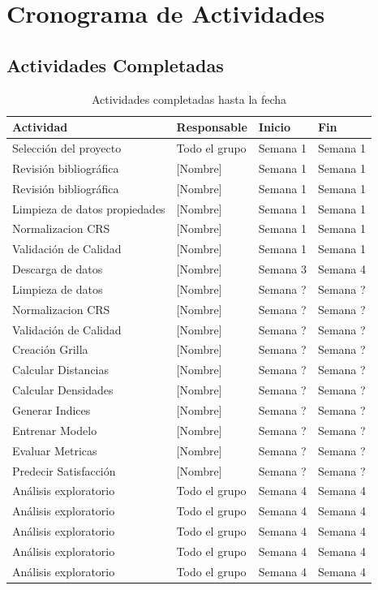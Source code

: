 \section{Cronograma de Actividades}

\subsection{Actividades Completadas}

\begin{table}[H]
\centering
\caption{Actividades completadas hasta la fecha}
\begin{tabular}{@{}llll@{}}
\toprule
\textbf{Actividad} & \textbf{Responsable} & \textbf{Inicio} & \textbf{Fin} \\
\midrule
Selección del proyecto & Todo el grupo & Semana 1 & Semana 1 \\
Revisión bibliográfica & [Nombre] & Semana 1 & Semana 1 \\
Revisión bibliográfica & [Nombre] & Semana 1 & Semana 1 \\
Limpieza de datos propiedades & [Nombre] & Semana 1 & Semana 1 \\
Normalizacion CRS & [Nombre] & Semana 1 & Semana 1 \\
Validación de Calidad & [Nombre] & Semana 1 & Semana 1 \\


Descarga de datos & [Nombre] & Semana 3 & Semana 4 \\
Limpieza de datos & [Nombre] & Semana ? & Semana ? \\
Normalizacion CRS & [Nombre] & Semana ? & Semana ? \\
Validación de Calidad & [Nombre] & Semana ? & Semana ? \\
Creación Grilla & [Nombre] & Semana ? & Semana ? \\
Calcular Distancias & [Nombre] & Semana ? & Semana ? \\
Calcular Densidades & [Nombre] & Semana ? & Semana ? \\
Generar Indices & [Nombre] & Semana ? & Semana ? \\
Entrenar Modelo & [Nombre] & Semana ? & Semana ? \\
Evaluar Metricas & [Nombre] & Semana ? & Semana ? \\
Predecir Satisfacción & [Nombre] & Semana ? & Semana ? \\


Análisis exploratorio & Todo el grupo & Semana 4 & Semana 4 \\
Análisis exploratorio & Todo el grupo & Semana 4 & Semana 4 \\
Análisis exploratorio & Todo el grupo & Semana 4 & Semana 4 \\
Análisis exploratorio & Todo el grupo & Semana 4 & Semana 4 \\
Análisis exploratorio & Todo el grupo & Semana 4 & Semana 4 \\


\end{tabular}
\end{table}
